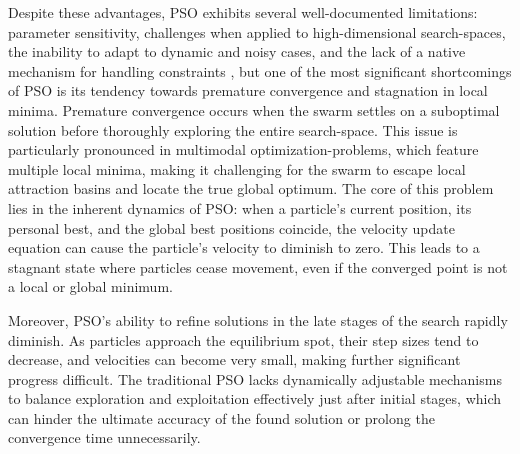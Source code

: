{Despite these advantages, PSO exhibits several well-documented limitations: 
parameter sensitivity,
challenges when applied to high-dimensional \glspl{search-space},
the inability to adapt to dynamic and noisy cases,
and the lack of a native mechanism for handling constraints
\citep[see,][]{abualigah2025particle},
but
one of the most significant shortcomings of PSO is its tendency towards premature convergence and stagnation in local minima. Premature convergence occurs when the swarm settles on a suboptimal solution before thoroughly exploring the entire \gls{search-space}. This issue is particularly pronounced in multimodal \glspl{optimization-problem}, which feature multiple local minima, making it challenging for the swarm to escape local attraction basins and locate the true global optimum. The core of this problem lies in the inherent dynamics of PSO: when a particle's current position, its personal best, and the global best positions coincide, the velocity update equation can cause the particle's velocity to diminish to zero. This leads to a stagnant state where particles cease movement, even if the converged point is not a local or global minimum.

Moreover, PSO's ability to refine solutions in the late stages of the search rapidly diminish. As particles approach the equilibrium spot, their step sizes tend to decrease, and velocities can become very small, making further significant progress difficult. The traditional PSO lacks dynamically adjustable mechanisms to balance exploration and exploitation effectively just after initial stages, which can hinder the ultimate accuracy of the found solution or prolong the convergence time unnecessarily.



}
